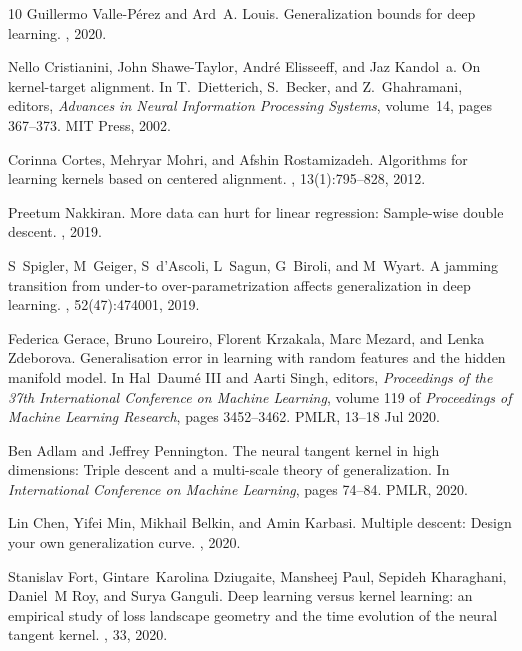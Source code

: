 \documentclass[11pt]{article}
\begin{document}
\begin{thebibliography}{10}
Guillermo Valle-Pérez and Ard~A. Louis.
\newblock Generalization bounds for deep learning.
, 2020.

Nello Cristianini, John Shawe-Taylor, Andr\'{e} Elisseeff, and Jaz Kandol~a.
\newblock On kernel-target alignment.
\newblock In T.~Dietterich, S.~Becker, and Z.~Ghahramani, editors, {\em
  Advances in Neural Information Processing Systems}, volume~14, pages
  367--373. MIT Press, 2002.

Corinna Cortes, Mehryar Mohri, and Afshin Rostamizadeh.
\newblock Algorithms for learning kernels based on centered alignment.
, 13(1):795--828, 2012.

Preetum Nakkiran.
\newblock More data can hurt for linear regression: Sample-wise double descent.
, 2019.

S~Spigler, M~Geiger, S~d’Ascoli, L~Sagun, G~Biroli, and M~Wyart.
\newblock A jamming transition from under-to over-parametrization affects
  generalization in deep learning.
,
  52(47):474001, 2019.

Federica Gerace, Bruno Loureiro, Florent Krzakala, Marc Mezard, and Lenka
  Zdeborova.
\newblock Generalisation error in learning with random features and the hidden
  manifold model.
\newblock In Hal~Daumé III and Aarti Singh, editors, {\em Proceedings of the
  37th International Conference on Machine Learning}, volume 119 of {\em
  Proceedings of Machine Learning Research}, pages 3452--3462. PMLR, 13--18 Jul
  2020.

Ben Adlam and Jeffrey Pennington.
\newblock The neural tangent kernel in high dimensions: Triple descent and a
  multi-scale theory of generalization.
\newblock In {\em International Conference on Machine Learning}, pages 74--84.
  PMLR, 2020.

Lin Chen, Yifei Min, Mikhail Belkin, and Amin Karbasi.
\newblock Multiple descent: Design your own generalization curve.
, 2020.

Stanislav Fort, Gintare~Karolina Dziugaite, Mansheej Paul, Sepideh Kharaghani,
  Daniel~M Roy, and Surya Ganguli.
\newblock Deep learning versus kernel learning: an empirical study of loss
  landscape geometry and the time evolution of the neural tangent kernel.
, 33, 2020.


\end{thebibliography}
\end{document}
